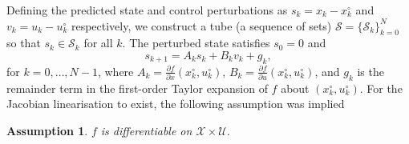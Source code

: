 \documentclass[a4paper, 10 pt, conference]{IEEEconf}
\newtheorem{assumption}{Assumption}
\def\S{\mathcal{S}}
\def\V{\mathcal{V}}
\def\U{\mathcal{U}}
\def\X{\mathcal{X}}
\def\bS{\boldsymbol{\mathcal{S}}}
\begin{document}
Defining the predicted state and control perturbations as $s_k = x_k - x^\circ_k$ and $v_k = {u_k-u^\circ_k}$ respectively, we construct a tube (a sequence of sets) $\bS = \{\S_k\}_{k=0}^N$ so that $s_k\in\S_k$ for all $k$.
%
The perturbed state satisfies $s_0=0$ and
%
\[
s_{k+1} = A_k s_k + B_k v_k  + g_k, 
\]
for $k= 0, \ldots, N-1$, where $A_k = \frac{\partial f}{\partial x}(x_k^\circ, u_k^\circ)$, $B_k = \frac{\partial f}{\partial u}(x_k^\circ, u_k^\circ)$, and $g_k$ is the remainder term in the first-order Taylor expansion of $f$ about $(x_k^\circ,u_k^\circ)$. For  the Jacobian linearisation to exist, the following assumption was implied

\begin{assumption}\label{assump:lin}
$f$ is differentiable on $\X\times\U$.
\end{assumption}
\end{document}
